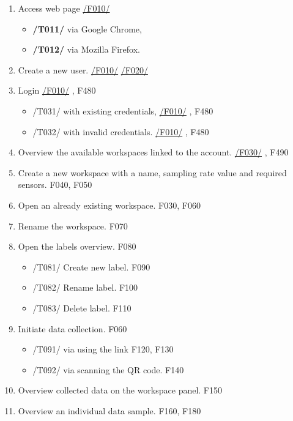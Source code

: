 \begin{enumerate}[{label = \textbf{/T{\protect\twodigits{\arabic{enumi}}}0/}, leftmargin = *}]
    \item Access web page \hyperref[welcome_page]{/F010/}
    \begin{itemize}
        \item \textbf{/T011/} via Google Chrome,
        \item \textbf{/T012/} via Mozilla Firefox.
    \end{itemize}
    \item Create a new user. \hyperref[welcome_page]{/F010/} \hyperref[registration_panel]{/F020/}
    \item Login \hyperref[welcome_page]{/F010/} , F480
    \begin{itemize}
        \item /T031/ with existing credentials, \hyperref[welcome_page]{/F010/} , F480
        \item /T032/ with invalid credentials. \hyperref[welcome_page]{/F010/} , F480
    \end{itemize}
    \item Overview the available workspaces linked to the account. \hyperref[workspaces_ov]{/F030/} , F490
    \item Create a new workspace with a name, sampling rate value and required sensors. F040, F050 
    \item Open an already existing workspace. F030, F060
    \item Rename the workspace. F070
    \item Open the labels overview. F080
    \begin{itemize}
        \item /T081/ Create new label. F090
        \item /T082/ Rename label. F100
        \item /T083/ Delete label. F110
    \end{itemize}
    \item Initiate data collection. F060
    \begin{itemize}
        \item /T091/ via using the link F120, F130
        \item /T092/ via scanning the QR code. F140
    \end{itemize}
    \item Overview collected data on the workspace panel. F150
    \item Overview an individual data sample. F160, F180

\end{enumerate}
